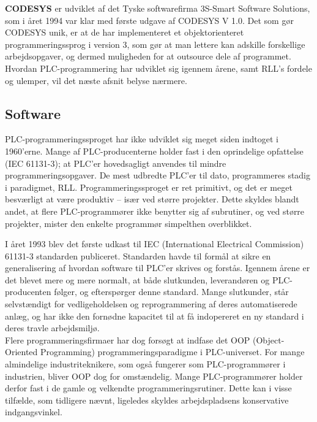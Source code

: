 \noindent\textbf{CODESYS} er udviklet af det Tyske softwarefirma 3S-Smart Software Solutions, som i året 1994 var klar med første udgave af CODESYS V 1.0. Det som gør CODESYS unik, er at de har implementeret et objektorienteret programmeringssprog i version 3, som gør at man lettere kan adskille forskellige arbejdsopgaver, og dermed muligheden for at outsource dele af programmet. \\

\noindent Hvordan PLC-programmering har udviklet sig igennem årene, samt RLL's fordele og ulemper, vil det næste afsnit belyse nærmere.

\subsection{Software}
PLC-programmeringssproget har ikke udviklet sig meget siden indtoget i 1960’erne. Mange af PLC-producenterne holder fast i den oprindelige opfattelse (IEC 61131-3); at PLC’er hovedsagligt anvendes til mindre programmeringsopgaver. De mest udbredte PLC’er til dato, programmeres stadig i paradigmet, RLL. Programmeringssproget er ret primitivt, og det er meget besværligt at være produktiv – især ved større projekter. Dette skyldes blandt andet, at flere PLC-programmører ikke benytter sig af subrutiner, og ved større projekter, mister den enkelte programmør simpelthen overblikket. 

I året 1993 blev det første udkast til IEC (International Electrical Commission) 61131-3 standarden publiceret\cite{iecStandard}. Standarden havde til formål at sikre en generalisering af hvordan software til PLC'er skrives og forstås. Igennem årene er det blevet mere og mere normalt, at både slutkunden, leverandøren og PLC-producenten følger, og efterspørger denne standard. Mange slutkunder, står selvstændigt for vedligeholdelsen og reprogrammering af deres automatiserede anlæg, og har ikke den fornødne kapacitet til at få indopereret en ny standard i deres travle arbejdsmiljø. \\

\noindent Flere programmeringsfirmaer har dog forsøgt at indfase det OOP (Object-Oriented Programming) programmeringsparadigme i PLC-universet. For mange almindelige industriteknikere, som også fungerer som PLC-programmører i industrien, bliver OOP dog for omstændelig. Mange PLC-programmører holder derfor fast i de gamle og velkendte programmeringsrutiner. Dette kan i visse tilfælde, som tidligere nævnt, ligeledes skyldes arbejdspladsens konservative indgangsvinkel\cite{PLC_Siemens_OOP}.  \\

